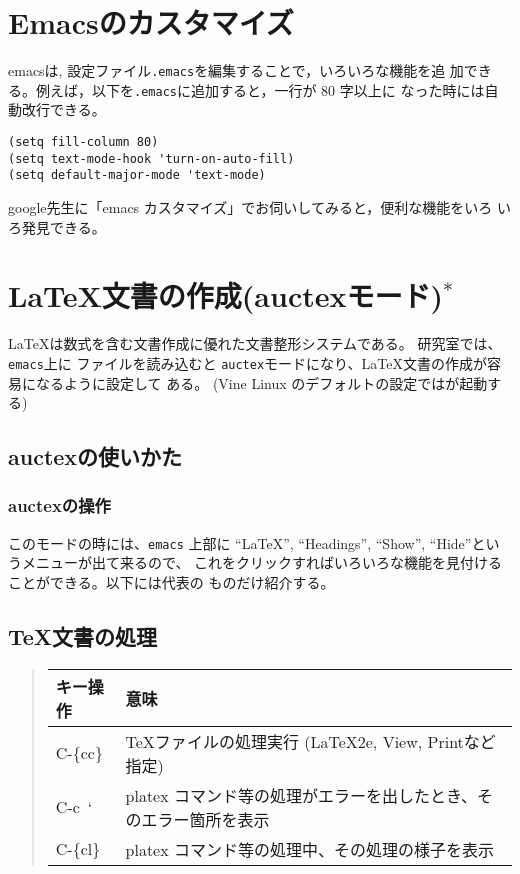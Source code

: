 \documentclass{jreport}
\begin{document}
\section{Emacsのカスタマイズ}
emacsは, 設定ファイル\verb|.emacs|を編集することで，いろいろな機能を追
加できる。例えば，以下を\verb|.emacs|に追加すると，一行が 80 字以上に
なった時には自動改行できる。
\begin{screen}
\begin{verbatim}
(setq fill-column 80)
(setq text-mode-hook 'turn-on-auto-fill)
(setq default-major-mode 'text-mode)
\end{verbatim}
\end{screen}

google先生に「emacs カスタマイズ」でお伺いしてみると，便利な機能をいろ
いろ発見できる。

\section{\LaTeX 文書の作成(auctexモード)$^*$}

\LaTeX は数式を含む文書作成に優れた文書整形システムである。
研究室では、\verb|emacs|上に ファイルを読み込むと
\verb|auctex|モードになり、\LaTeX 文書の作成が容易になるように設定して
ある。
(Vine Linux のデフォルトの設定ではが起動する)


\subsection{auctexの使いかた}

\subsubsection{auctexの操作}
このモードの時には、\verb|emacs| 上部に
``LaTeX'', ``Headings'', ``Show'', ``Hide''というメニューが出て来るので、
これをクリックすればいろいろな機能を見付けることができる。以下には代表の
ものだけ紹介する。

\subsection{TeX文書の処理}

\begin{quote}
\begin{tabular}[t]{ll}\hline
キー操作 & 意味 \\ \hline
C-\{cc\} & TeXファイルの処理実行 (LaTeX2e, View, Printなど指定)\\
C-c~` & platex コマンド等の処理がエラーを出したとき、そのエラー箇所を表示\\
C-\{cl\} & platex コマンド等の処理中、その処理の様子を表示\\
\hline
\end{tabular}
\end{quote}
\end{document}
